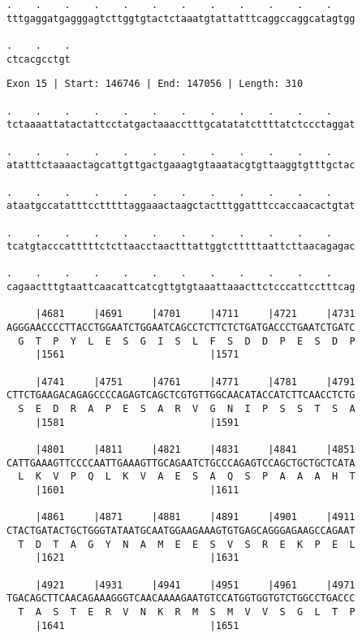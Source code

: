 \documentclass{article}
\begin{document}
\newpage
\begin{Verbatim}[fontfamily=courier]
.    .    .    .    .    .    .    .    .    .    .    .    
tttgaggatgagggagtcttggtgtactctaaatgtattatttcaggccaggcatagtgg

.    .    .
ctcacgcctgt
\end{Verbatim}
\newpage
\begin{Verbatim}[fontfamily=courier]
Exon 15 | Start: 146746 | End: 147056 | Length: 310

.    .    .    .    .    .    .    .    .    .    .    .    
tctaaaattatactattcctatgactaaacctttgcatatatcttttatctccctaggat

.    .    .    .    .    .    .    .    .    .    .    .    
atatttctaaaactagcattgttgactgaaagtgtaaatacgtgttaaggtgtttgctac

.    .    .    .    .    .    .    .    .    .    .    .    
ataatgccatatttcctttttaggaaactaagctactttggatttccaccaacactgtat

.    .    .    .    .    .    .    .    .    .    .    .    
tcatgtacccatttttctcttaacctaactttattggtctttttaattcttaacagagac

.    .    .    .    .    .    .    .    .    .    .    .    
cagaactttgtaattcaacattcatcgttgtgtaaattaaacttctcccattcctttcag

     |4681     |4691     |4701     |4711     |4721     |4731
AGGGAACCCCTTACCTGGAATCTGGAATCAGCCTCTTCTCTGATGACCCTGAATCTGATC
  G  T  P  Y  L  E  S  G  I  S  L  F  S  D  D  P  E  S  D  P
     |1561                         |1571                    

     |4741     |4751     |4761     |4771     |4781     |4791
CTTCTGAAGACAGAGCCCCAGAGTCAGCTCGTGTTGGCAACATACCATCTTCAACCTCTG
  S  E  D  R  A  P  E  S  A  R  V  G  N  I  P  S  S  T  S  A
     |1581                         |1591                    

     |4801     |4811     |4821     |4831     |4841     |4851
CATTGAAAGTTCCCCAATTGAAAGTTGCAGAATCTGCCCAGAGTCCAGCTGCTGCTCATA
  L  K  V  P  Q  L  K  V  A  E  S  A  Q  S  P  A  A  A  H  T
     |1601                         |1611                    

     |4861     |4871     |4881     |4891     |4901     |4911
CTACTGATACTGCTGGGTATAATGCAATGGAAGAAAGTGTGAGCAGGGAGAAGCCAGAAT
  T  D  T  A  G  Y  N  A  M  E  E  S  V  S  R  E  K  P  E  L
     |1621                         |1631                    

     |4921     |4931     |4941     |4951     |4961     |4971
TGACAGCTTCAACAGAAAGGGTCAACAAAAGAATGTCCATGGTGGTGTCTGGCCTGACCC
  T  A  S  T  E  R  V  N  K  R  M  S  M  V  V  S  G  L  T  P
     |1641                         |1651                    

\end{Verbatim}
\end{document}
